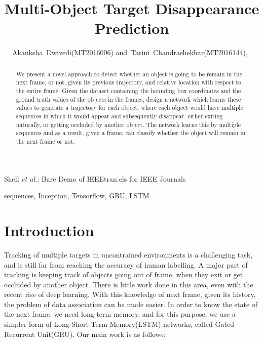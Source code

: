 \documentclass[journal]{IEEEtran}
\begin{document}
\title{Multi-Object Target Disappearance Prediction }
\author{Akanksha~Dwivedi(MT2016006)
        and~Tarini~Chandrashekhar(MT2016144),~}%

%
{Shell \MakeLowercase{\textit{et al.}}: Bare Demo of IEEEtran.cls for IEEE Journals}


\maketitle

\begin{abstract}
We present a novel approach to detect whether an object is going to be remain in the next frame, or not, given its previous trajectory, and relative location with respect to the entire frame. Given the dataset containing the bounding box coordinates and the ground truth values of the objects in the frames, design a network which learns these values to generate a trajectory for each object, where each object would have multiple sequences in which it would appear and subsequently disappear, either exiting naturally, or getting occluded by another object. The network learns this by multiple sequences and as a result, given a frame, can classify whether the object will remain in the next frame or not.
\end{abstract}

\begin{IEEEkeywords}
sequences, Inception, Tensorflow, GRU, LSTM.
\end{IEEEkeywords}
   
\IEEEpeerreviewmaketitle

\section{Introduction}
Tracking of multiple targets in uncontrained environments is a challenging task, and is still far from reaching the accuracy of human labelling. A major part of tracking is keeping track of objects going out of frame, when they exit or get occluded by another object. There is little work done in this area, even with the recent rise of deep learning. With this knowledge of next frame, given its history, the problem of data association can be made easier. In order to know the state of the next frame, we need long-term memory, and for this purpose, we use a simpler form of Long-Short-Term-Memory(LSTM) networks, called Gated Recurrent Unit(GRU). Our main work is as follows:
\end{document}
